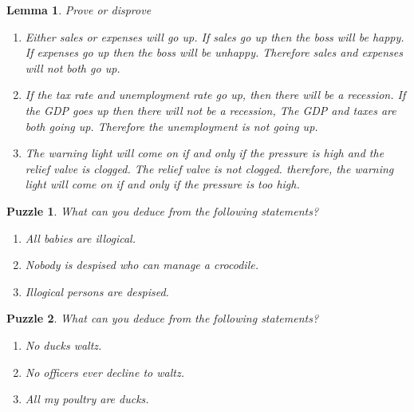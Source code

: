 \documentclass[11pt, oneside]{article}   	%
\newtheorem{lemma}{Lemma}
\newtheorem{puzzle}{Puzzle}
\begin{document}
\begin{lemma} Prove or disprove
\begin{enumerate}
\item Either sales or expenses will go up. If sales go up then the boss will be happy. 
If expenses go up then the boss will be unhappy. Therefore sales and expenses will not both go up.

\item If the tax rate and unemployment rate go up, then there will be a recession. 
If the GDP goes up then there will not be a recession, The GDP and taxes are both going up. 
Therefore the unemployment is not going up.

\item The warning light will come on if and only if the pressure is high and the relief valve is clogged. 
The relief valve is not clogged. therefore, the warning light will come on if and only if the pressure is too high.
\end{enumerate}
\end{lemma}

\begin{puzzle} What can you deduce from the following statements?
\begin{enumerate}
\item All babies are illogical.
\item Nobody is despised who can manage a crocodile.
\item Illogical persons are despised.
\end{enumerate}
\end{puzzle}


\begin{puzzle} What can you deduce from the following statements?
\begin{enumerate}
\item No ducks waltz.
\item No officers ever decline to waltz.
\item All my poultry are ducks.
\end{enumerate}
\end{puzzle}
\end{document}
